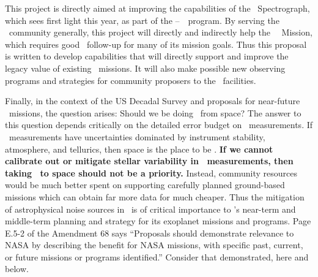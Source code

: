 \documentclass[12pt, letterpaper]{article}
\begin{document}
This project is directly aimed at improving the capabilities of the
\NEID\ Spectrograph, which sees first light this year,
as part of the \NASA--\NSF\ \NNEXPLORE\ program.
By serving the \EPRV\ community generally, this project will
directly and indirectly help the \NASA\ \TESS\ Mission,
which requires good \RV\ follow-up for many of its mission goals.
Thus this proposal is written to develop capabilities that will
directly support and improve the legacy value of existing
\NASA\ missions.
It will also make possible new observing programs and strategies for
community proposers to the \NNEXPLORE\ facilities.

Finally, in the context of the US Decadal Survey and proposals for near-future
\NASA\ missions, the question arises: Should we be doing \EPRV\ from space?
The answer to this question depends critically on the detailed error budget on
\EPRV\ measurements.
If \EPRV\ measurements have uncertainties dominated by instrument
stability, atmosphere, and tellurics, then space is the place to be \citep[e.g.][]{Plavchan2018}.
\textbf{If we cannot calibrate out or mitigate stellar variability
  in \EPRV\ measurements, then taking
  \EPRV\ to space should not be a priority.}
Instead, community resources would be much better spent on supporting 
carefully planned ground-based missions which can obtain far more data 
for much cheaper. 
Thus the mitigation of astrophysical noise sources in \EPRV\ is of critical
importance to \NASA's near-term and middle-term planning and strategy
for its exoplanet missions and programs.
Page E.5-2 of the  Amendment 68 says ``Proposals
should demonstrate relevance to NASA by describing the benefit for
NASA missions, with specific past, current, or future missions or
programs identified.''  Consider that demonstrated, here and below.
\end{document}
